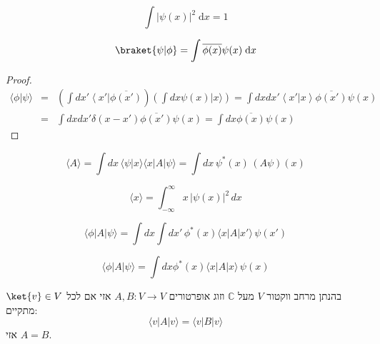 \documentclass{tstextbook}
\begin{document}
\begin{definition}
$$\int \left|\psi\left(x\right)\right|^{2}\;\mathrm{d}x=1$$

\end{definition}
\begin{proposition}
$$\braket{ \psi | \phi } =\int \overline{\phi(x)} \psi(x) \;\mathrm{d}x$$

\end{proposition}
\begin{proof}
$$ \begin{array}{rcl}\langle\phi|\psi\rangle&=&\left(\int dx'\left\langle x'\right|\overline{\phi\left(x'\right)}\right)\left(\int dx\psi\left(x\right)|x\rangle\right)=\int dxdx'\left\langle x'|x\right\rangle\overline{\phi\left(x'\right)}\psi\left(x\right)\\&=&\int dxdx'\delta\left(x-x'\right)\overline{\phi\left(x'\right)}\psi\left(x\right)=\int dx\overline{\phi\left(x\right)}\psi\left(x\right)\end{array}$$

\end{proof}
\begin{proposition}
$$\langle A\rangle=\int d x\,\langle\psi|x\rangle\langle x|A|\psi\rangle=\int d x\,\psi^{*}(x)\,(A\psi)(x)$$

\end{proposition}
\begin{example}
$$\langle x\rangle=\int_{-\infty}^{\infty}x\,|\psi(x)|^{2}\,d x$$

\end{example}
\begin{proposition}
$$\langle\phi|A|\psi\rangle=\int d x\int d x'\,\phi^{*}(x)\langle x|A|x'\rangle\,\psi(x')$$

$$\langle\phi|A|\psi\rangle=\int d x\phi^{*}(x)\langle x|A|x\rangle\,\psi(x)$$

\end{proposition}
\begin{proposition}
בהנתן מרחב ווקטור \(V\) מעל \(\mathbb{C}\) וזוג אופרטורים \(A,B:V\to V\) אזי אם לכל \(\ket{v}\in V\) מתקיים:
$$\langle v|A|v \rangle =\langle v|B|v \rangle $$
אזי \(A=B\).

\end{proposition}
\end{document}

